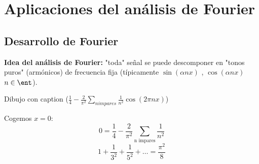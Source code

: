 
\chapter{Aplicaciones del análisis de Fourier}
\section{Desarrollo de Fourier}
\textbf{Idea del análisis de Fourier:} "toda" señal se puede descomponer en "tonos puros" (armónicos) de frecuencia fija (típicamente $\sin(\alpha n x)$ , $\cos(\alpha n x)$  $ n \in \ent$).

Dibujo con caption ($\frac{1}{4} - \frac{2}{\pi^2} \sum_{n impares} \frac{1}{n^2} \cos(2\pi n x)$)

\begin{example}
	Cogemos $x=0$:
	$$0 = \frac{1}{4} - \frac{2}{\pi^2} \sum_{\text{n impares}} \frac{1}{n^2}$$ 
	$$1 + \frac{1}{3^2} + \frac{1}{5^2} + \ldots = \frac{\pi^2}{8}$$
\end{example}

